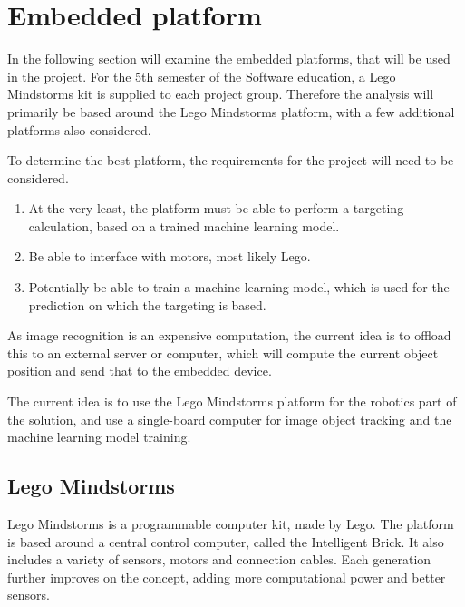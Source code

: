 \section{Embedded platform}
In the following section will examine the embedded platforms, that will be used in the project.
For the 5th semester of the Software education, a Lego Mindstorms kit is supplied to each project group.
Therefore the analysis will primarily be based around the Lego Mindstorms platform, with a few additional platforms also considered.

To determine the best platform, the requirements for the project will need to be considered.
\begin{enumerate}
	\item At the very least, the platform must be able to perform a targeting calculation, based on a trained machine learning model.
	\item Be able to interface with motors, most likely Lego.
	\item Potentially be able to train a machine learning model, which is used for the prediction on which the targeting is based.
\end{enumerate}

As image recognition is an expensive computation, the current idea is to offload this to an external server or computer, which will compute the current object position and send that to the embedded device.

The current idea is to use the Lego Mindstorms platform for the robotics part of the solution, and use a single-board computer for image object tracking and the machine learning model training.

\subsection{Lego Mindstorms}
Lego Mindstorms is a programmable computer kit, made by Lego.
The platform is based around a central control computer, called the Intelligent Brick.
It also includes a variety of sensors, motors and connection cables.
Each generation further improves on the concept, adding more computational power and better sensors.

